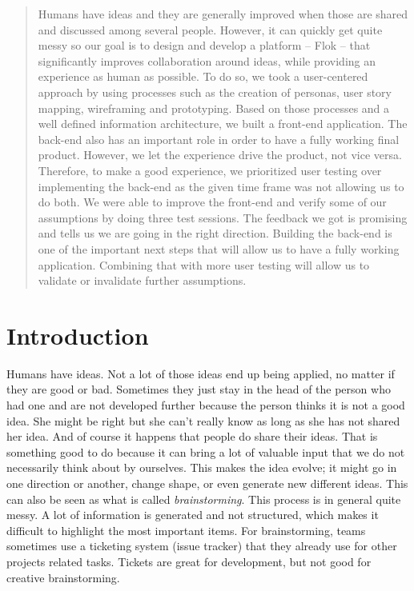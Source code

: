 \documentclass[a4paper,12pt,twoside]{article}
\begin{document}
\vspace*{5cm}
\begin{abstract}
    Humans have ideas and they are generally improved when those are shared and discussed among several people.
    However, it can quickly get quite messy so our goal is to design and develop a platform – Flok – that significantly improves collaboration around ideas, while providing an experience as human as possible.
    To do so, we took a user-centered approach by using processes such as the creation of personas, user story mapping, wireframing and prototyping.
    Based on those processes and a well defined information architecture, we built a front-end application.
    The back-end also has an important role in order to have a fully working final product.
    However, we let the experience drive the product, not vice versa.
    Therefore, to make a good experience, we prioritized user testing over implementing the back-end as the given time frame was not allowing us to do both.
    We were able to improve the front-end and verify some of our assumptions by doing three test sessions.
    The feedback we got is promising and tells us we are going in the right direction.
    Building the back-end is one of the important next steps that will allow us to have a fully working application.
    Combining that with more user testing will allow us to validate or invalidate further assumptions.
\end{abstract}
\cleardoublepage

\tableofcontents
\cleardoublepage

\setcounter{page}{1}


\section{Introduction}
Humans have ideas. Not a lot of those ideas end up being applied, no matter if they are good or bad.
Sometimes they just stay in the head of the person who had one and are not developed further because the person thinks it is not a good idea.
She might be right but she can't really know as long as she has not shared her idea.
And of course it happens that people do share their ideas.
That is something good to do because it can bring a lot of valuable input that we do not necessarily think about by ourselves.
This makes the idea evolve; it might go in one direction or another, change shape, or even generate new different ideas.
This can also be seen as what is called \emph{brainstorming}. This process is in general quite messy.
A lot of information is generated and not structured, which makes it difficult to highlight the most important items.
For brainstorming, teams sometimes use a ticketing system (issue tracker) that they already use for other projects related tasks.
Tickets are great for development, but not good for creative brainstorming.
\end{document}
